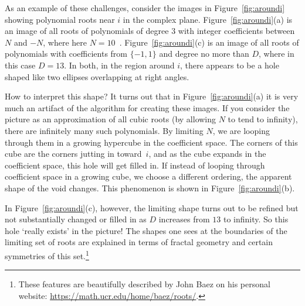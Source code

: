 \documentclass{notices}
\begin{document}
As an example of these challenges, consider the images in Figure~\ref{fig:aroundi} showing polynomial roots near $i$ in the complex plane. 
Figure~\ref{fig:aroundi}(a) is an image of all roots of polynomials of degree $3$ with integer coefficients between $N$ and $-N$, where here $N=10$~\cite{HST22}. 
Figure~\ref{fig:aroundi}(c) is an image of all roots of polynomials with coefficients from $\{-1,1\}$ and degree no more than $D$, where in this case $D = 13$.  
In both, in the region around $i$, there appears to be a hole shaped like two ellipses overlapping at right angles. 

How to interpret this shape?  
It turns out that in Figure~\ref{fig:aroundi}(a) it is very much an artifact of the algorithm for creating these images. If you consider the picture as an approximation of all cubic roots (by allowing $N$ to tend to infinity), there are infinitely many such polynomials. By limiting $N$, we are looping through them in a growing hypercube in the coefficient space.  
The corners of this cube are the corners jutting in toward~$i$, and as the cube expands in the coefficient space, this hole will get filled in.  
If instead of looping through coefficient space in a growing cube, we choose a different ordering, the apparent shape of the void changes. 
This phenomenon is shown in Figure~\ref{fig:aroundi}(b).  

In Figure~\ref{fig:aroundi}(c), however, the limiting shape turns out to be refined but not substantially changed or filled in as $D$ increases from $13$ to infinity.
So this hole `really exists' in the picture!  
The shapes one sees at the boundaries of the limiting set of roots are explained in terms of fractal geometry and certain symmetries of this set.\footnote{These features are beautifully described by John Baez on his personal website: \url{ https://math.ucr.edu/home/baez/roots/}.} 
\end{document}
